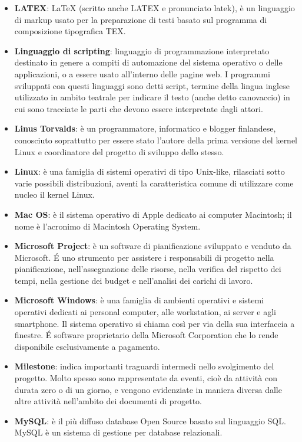 \begin{itemize}
\item[] \textbf{LATEX}: LaTeX (scritto anche LATEX e pronunciato latek), è un linguaggio di markup usato per la preparazione di testi basato sul programma di composizione tipografica TEX.
\item[] \textbf{Linguaggio di scripting}: linguaggio di programmazione interpretato destinato in genere a compiti di automazione del sistema operativo o delle applicazioni, o a essere usato all'interno delle pagine web. I programmi sviluppati con questi linguaggi sono detti script, termine della lingua inglese utilizzato in ambito teatrale per indicare il testo (anche detto canovaccio) in cui sono tracciate le parti che devono essere interpretate dagli attori.
\item[] \textbf{Linus Torvalds}: è un programmatore, informatico e blogger finlandese, conosciuto soprattutto per essere stato l'autore della prima versione del kernel Linux e coordinatore del progetto di sviluppo dello stesso.
\item[] \textbf{Linux}: è una famiglia di sistemi operativi di tipo Unix-like, rilasciati sotto varie possibili distribuzioni, aventi la caratteristica comune di utilizzare come nucleo il kernel Linux.
\end{itemize}
\newpage

\begin{itemize}
\item[] \textbf{Mac OS}: è il sistema operativo di Apple dedicato ai computer Macintosh; il nome è l'acronimo di Macintosh Operating System.
\item[] \textbf{Microsoft Project}: è un software di pianificazione sviluppato e venduto da Microsoft. \'E uno strumento per assistere i responsabili di progetto nella pianificazione, nell'assegnazione delle risorse, nella verifica del rispetto dei tempi, nella gestione dei budget e nell'analisi dei carichi di lavoro.
\item[] \textbf{Microsoft Windows}: è una famiglia di ambienti operativi e sistemi operativi dedicati ai personal computer, alle workstation, ai server e agli smartphone. Il sistema operativo si chiama così per via della sua interfaccia a finestre. É software proprietario della Microsoft Corporation che lo rende disponibile esclusivamente a pagamento.
\item[] \textbf{Milestone}: indica importanti traguardi intermedi nello svolgimento del progetto. Molto spesso sono rappresentate da eventi, cioè da attività con durata zero o di un giorno, e vengono evidenziate in maniera diversa dalle altre attività nell'ambito dei documenti di progetto.
\item[] \textbf{MySQL}: è il più diffuso database Open Source basato sul linguaggio SQL. MySQL è un sistema di gestione per database relazionali.
\end{itemize}
\newpage

